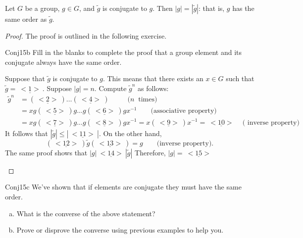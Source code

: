 \begin{thm} Let $G$ be a group, $g \in G$, and $\tilde{g}$ is conjugate to $g$. Then $|g| = |\tilde{g}|$: that is,  $g$ has the same order as $\tilde{g}$.
\end{thm}

\begin{proof}  The proof is outlined in the following exercise.

\begin{exercise}{Conj15b}
Fill in the blanks to complete the proof that a group element and its conjugate always have the same order.

Suppose that $\tilde{g}$ is conjugate to $g$. This means that there exists an $x\in G$ such that $\tilde{g}=\underline{~<1>~}$. Suppose $|g|=n$. Compute $\tilde{g}^n$ as follows:
\begin{align*}
 \tilde{g}^n&=(\underline{~<2>~}) \ldots (\underline{~<4>~})~~~~~~~~~~~~(n~\text{ times)}\\ 
& =xg(\underline{~<5>~})g \ldots g(\underline{~<6>~})gx^{-1}\qquad\text{(associative property)}\\
&=xg(\underline{~<7>~})g...g(\underline{~<8>~})gx^{-1}=x(\underline{~<9>~})x^{-1}=\underline{~<10>~}\quad\text{( inverse property)}
\end{align*}
\noindent
It follows that  $| \tilde{g}| \leq |\underline{~<11>~}|$. On the other hand, \[(\underline{~<12>~})\tilde{g}(\underline{~<13>~})=g\qquad\text{(inverse property)}.\]  
The same proof shows that $|g|\underline{~<14>~}|\tilde{g}|$ Therefore,  $|g|=\underline{~<15>~}$ 
\end {exercise}
\end{proof}

\begin{exercise}{Conj15c}
We've shown that if elements are conjugate they must have the same order.
\begin {enumerate}[(a)]
\item What is the converse of the above statement?
\item Prove or disprove the converse using previous examples to help you.
\end{enumerate}
\end {exercise}
 


